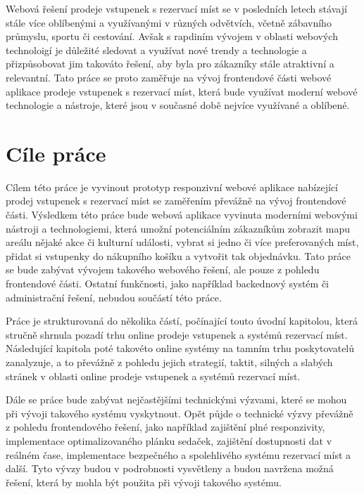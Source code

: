 Webová řešení prodeje vstupenek s rezervací míst se v posledních letech stávají stále více oblíbenými a využívanými v různých odvětvích, včetně zábavního průmyslu, sportu či cestování.
Avšak s rapdiním vývojem v oblasti webových technoloigí je důležité sledovat a využívat nové trendy a technologie a přizpůsobovat jim takováto řešení, aby byla pro zákazníky stále atraktivní a relevantní.
Tato práce se proto zaměřuje na vývoj frontendové části webové aplikace prodeje vstupenek s rezervací míst, která bude využívat moderní webové technologie a nástroje, které jsou v současné době nejvíce využívané a oblíbené.

\section*{Cíle práce}
\label{sec:uvod-cile-prace}
Cílem této práce je vyvinout prototyp responzivní webové aplikace nabízející prodej vstupenek s rezervací míst se zaměřením převážně na vývoj frontendové části.
Výsledkem této práce bude webová aplikace vyvinuta moderními webovými nástroji a technologiemi, která umožní potenciálním zákazníkům zobrazit mapu areálu nějaké akce či kulturní události, vybrat si jedno či více preferovaných míst, přidat si vstupenky do nákupního košíku a vytvořit tak objednávku.
Tato práce se bude zabývat vývojem takového webového řešení, ale pouze z pohledu frontendové části.
Ostatní funkčnosti, jako například backednový systém či administrační řešení, nebudou součástí této práce.

Práce je strukturovaná do několika částí, počínající touto úvodní kapitolou, která stručně shrnula pozadí trhu online prodeje vstupenek a systémů rezervací míst.
Následující kapitola poté takovéto online systémy na tamním trhu poskytovatelů zanalyzuje, a to převážně z pohledu jejich strategií, taktit, silných a slabých stránek v oblasti online prodeje vstupenek a systémů rezervací míst.

Dále se práce bude zabývat nejčastějšími technickými výzvami, které se mohou při vývoji takového systému vyskytnout.
Opět půjde o technické výzvy převážně z pohledu frontendového řešení, jako například zajištění plné responzivity, implementace optimalizovaného plánku sedaček, zajištění dostupnosti dat v reálném čase, implementace bezpečného a spolehlivého systému rezervací míst a další.
Tyto vývzy budou v podrobnosti vysvětleny a budou navržena možná řešení, která by mohla být použita při vývoji takového systému.


